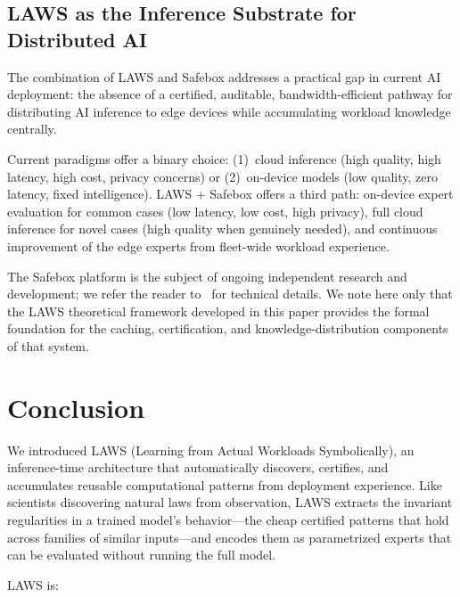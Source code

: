 \documentclass[11pt]{article}
\begin{document}
\subsection{LAWS as the Inference Substrate for Distributed AI}

The combination of LAWS and Safebox addresses a practical gap in current AI
deployment: the absence of a certified, auditable, bandwidth-efficient pathway
for distributing AI inference to edge devices while accumulating workload
knowledge centrally.

Current paradigms offer a binary choice: (1)~cloud inference (high quality,
high latency, high cost, privacy concerns) or (2)~on-device models (low quality,
zero latency, fixed intelligence).  LAWS + Safebox offers a third path:
on-device expert evaluation for common cases (low latency, low cost, high
privacy), full cloud inference for novel cases (high quality when genuinely
needed), and continuous improvement of the edge experts from fleet-wide
workload experience.

The Safebox platform is the subject of ongoing independent research and
development; we refer the reader to~\cite{safebots,safebox_protocol} for
technical details.  We note here only that the LAWS theoretical framework
developed in this paper provides the formal foundation for the caching,
certification, and knowledge-distribution components of that system.

\section{Conclusion}
\label{sec:conclusion}

We introduced LAWS (Learning from Actual Workloads Symbolically), an inference-time
architecture that automatically discovers, certifies, and accumulates reusable
computational patterns from deployment experience.  Like scientists discovering
natural laws from observation, LAWS extracts the invariant regularities in a
trained model's behavior---the cheap certified patterns that hold across families
of similar inputs---and encodes them as parametrized experts that can be
evaluated without running the full model.

LAWS is:
\end{document}
